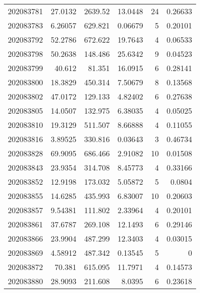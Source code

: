 \begin{tabular}{rrrrrr}
 202083781 &         27.0132  &     2639.52   &           13.0448  &          24 & 0.26633 \\
 202083783 &          6.26057 &      629.821  &            0.06679 &           5 & 0.20101 \\
 202083792 &         52.2786  &      672.622  &           19.7643  &           4 & 0.06533 \\
 202083798 &         50.2638  &      148.486  &           25.6342  &           9 & 0.04523 \\
 202083799 &         40.612   &       81.351  &           16.0915  &           6 & 0.28141 \\
 202083800 &         18.3829  &      450.314  &            7.50679 &           8 & 0.13568 \\
 202083802 &         47.0172  &      129.133  &            4.82402 &           6 & 0.27638 \\
 202083805 &         14.0507  &      132.975  &            6.38035 &           4 & 0.05025 \\
 202083810 &         19.3129  &      511.507  &            8.66888 &           4 & 0.11055 \\
 202083816 &          3.89525 &      330.816  &            0.03643 &           3 & 0.46734 \\
 202083828 &         69.9095  &      686.466  &            2.91082 &          10 & 0.01508 \\
 202083843 &         23.9354  &      314.708  &            8.45773 &           4 & 0.33166 \\
 202083852 &         12.9198  &      173.032  &            5.05872 &           5 & 0.0804  \\
 202083855 &         14.6285  &      435.993  &            6.83007 &          10 & 0.20603 \\
 202083857 &          9.54381 &      111.802  &            2.33964 &           4 & 0.20101 \\
 202083861 &         37.6787  &      269.108  &           12.1493  &           6 & 0.29146 \\
 202083866 &         23.9904  &      487.299  &           12.3403  &           4 & 0.03015 \\
 202083869 &          4.58912 &      487.342  &            0.13545 &           5 & 0       \\
 202083872 &         70.381   &      615.095  &           11.7971  &           4 & 0.14573 \\
 202083880 &         28.9093  &      211.608  &            8.0395  &           6 & 0.23618 \\

\end{tabular}

